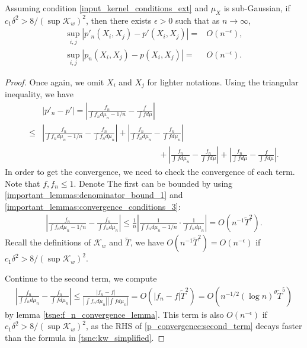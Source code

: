 \begin{lemma} \label{tsne:integrand_lemma_2}
    Assuming condition \ref{input_kernel_conditions_ext} and $\mu_X$ is sub-Gaussian, if $c_1\delta^2 > 8/(\sup \mathcal{K}_w)^2$, then there exists $\epsilon>0$ such that as $n \to \infty$,
    \begin{align}
        \sup_{i,j} \left|p'_n(X_i,X_j) - p'(X_i,X_j)\right| = & O(n^{-\epsilon}), \nonumber \\
        \sup_{i,j} \left|p_n(X_i,X_j) - p(X_i,X_j)\right| =   & O(n^{-\epsilon}) \nonumber.
    \end{align}
\end{lemma}
\begin{proof}
    Once again, we omit $X_i$ and $X_j$ for lighter notations. Using the triangular inequality, we have
    \begin{align} \label{p_convergence:triangle_inequality}
             & |p'_n - p'| = \left|\frac{f_n}{\int f_n d\mu_n - 1/n} - \frac{f}{\int f d \mu}\right| \nonumber                                                                                       \\
        \leq & \left|\frac{f_n}{\int f_n d\mu_n - 1/n} - \frac{f_n}{\int f_n d \mu_n}\right| + \left|\frac{f_n}{\int f_n d\mu_n} - \frac{f_n}{\int f d \mu_n}\right| \nonumber                       \\
             & \qquad \qquad \qquad \qquad \qquad \qquad \qquad + \left|\frac{f_n}{\int f d\mu_n} - \frac{f_n}{\int f d \mu}\right| + \left|\frac{f_n}{\int f d\mu} - \frac{f}{\int f d \mu}\right|.
    \end{align}
    In order to get the convergence, we need to check the convergence of each term. Note that $f,f_n \leq 1$. Denote
    The first can be bounded by using \eqref{important_lemmas:denominator_bound_1} and \eqref{important_lemmas:convergence_conditions_3}:
    \begin{align} \label{p_convergence:first_term}
        \left|\frac{f_n}{\int f_n d\mu_n - 1/n} - \frac{f_n}{\int f_n d \mu_n}\right| \leq \frac{1}{n} \left|\frac{1}{\int f_n d\mu_n - 1/n} \cdot \frac{1}{\int f_n d\mu_n}\right|= O(n^{-1}\tilde{T}^2).
    \end{align}
    Recall the definitions of $\mathcal{K}_w$ and $\tilde{T}$, we have $O(n^{-1}\tilde{T}^2) = O(n^{-\epsilon})$ if $c_1\delta^2 > 8/(\sup \mathcal{K}_w)^2$.

    Continue to the second term, we compute
    \begin{align} \label{p_convergence:second_term}
        \left|\frac{f_n}{\int f_n d\mu_n} - \frac{f_n}{\int f d \mu_n}\right| \leq \frac{|f_n-f|}{|\int f_n d\mu_n||\int f d\mu_n|} = O(|f_n-f|\tilde{T}^2) = O(n^{-1/2} (\log n)^{\theta}\tilde{T}^5)
    \end{align}
    by lemma \ref{tsne:f_n_convergence_lemma}. This term is also $O(n^{-\epsilon})$ if $c_1\delta^2 > 8/(\sup \mathcal{K}_w)^2$, as the RHS of \eqref{p_convergence:second_term} decays faster than the formula in \eqref{tsne:kw_simplified}.


\end{proof}
